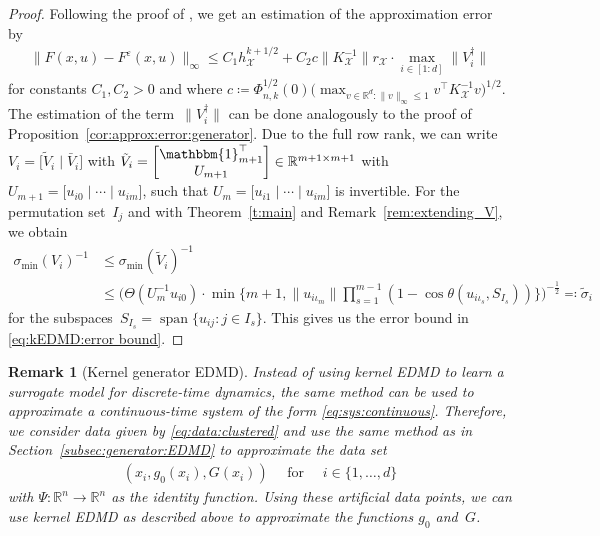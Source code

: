 \documentclass[a4paper, reqno]{amsart}
\newcommand{\R}{\ensuremath{\mathbb R}}
\newtheorem{remark}[theorem]{Remark}
\begin{document}
\begin{proof}
Following the proof of \cite[Thm. 3]{schimperna2025data}, we get an estimation of the approximation error by 
\begin{align*}
    \|F(x,u) - F^\varepsilon(x,u)\|_\infty \leq C_1 h_\mathcal{X}^{k+1/2} + C_2 c \|K_\mathcal{X}^{-1}\|r_\mathcal{X} \cdot \max_{i \in [1:d]}\|V_i^\dagger\|
\end{align*}
for constants $C_1, C_2 > 0$ and where $c \coloneqq \Phi_{n,k}^{1/2}(0)\big( \max_{v \in \mathbb{R}^d: \| v \|_\infty \leq 1} v^\top {K}_\mathcal{X}^{-1}v \big)^{1/2}$. \\ 
The estimation of the term~$\|V_i^\dagger\|$ can be done analogously to the proof of Proposition~\ref{cor:approx:error:generator}. 
Due to the full row rank, we can write $V_i = \Big[\tilde{V}_i \mid \bar{V}_i\Big]$ with $\tilde{V}_i = \begin{bmatrix}\mathbbm{1}_{m+1}^\top\\U_{m+1}\end{bmatrix} \in \R^{m + 1\times m + 1}$ with $U_{m+1} = \big[ {u}_{i0} \mid \cdots \mid {u}_{im} \big]$, such that $U_{m} = \big[ {u}_{i1} \mid \cdots \mid {u}_{im} \big]$ is invertible. For the permutation set~$I_j$ and with Theorem~\ref{t:main} and Remark~\ref{rem:extending_V}, we obtain 
\begin{align*}
   \sigma_{\min} (V_i)^{-1} &\leq \sigma_\mathrm{min}(\tilde{V}_i)^{-1} \\
    &\leq \Big(\Theta(U_m^{-1}u_{i0}) \cdot \min\{m + 1, \|u_{i\iota_m}\| \prod_{s = 1}^{m - 1}(1 - \cos\theta(u_{i\iota_s}, S_{I_s}))\}\Big)^{-\frac12}\eqqcolon \tilde{\sigma}_i
\end{align*}
for the subspaces~$S_{I_s} = \operatorname{span}\{u_{ij} : j\in I_s\}$. This gives us the error bound in \eqref{eq:kEDMD:error bound}.
\end{proof}

\begin{remark}[Kernel generator EDMD]
Instead of using kernel EDMD to learn a surrogate model for discrete-time dynamics, the same method can be used to approximate a continuous-time system of the form \eqref{eq:sys:continuous}. Therefore, we consider data given by \eqref{eq:data:clustered}
and use the same method as in Section~\ref{subsec:generator:EDMD} to approximate the data set 
\begin{align}%
    (x_i, g_0(x_i), G(x_i)) \quad \text{ for } \quad i \in \{1,\ldots,d\}
\end{align}
with $\Psi:\R^n \rightarrow \R^n$ as the identity function. Using these artificial data points, we can use kernel EDMD as described above to approximate the functions $g_0$ and~$G$.
\end{remark}
\end{document}
